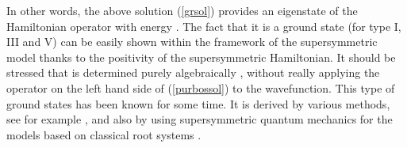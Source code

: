 \documentclass[a4paper,12pt]{article}
\begin{document}
In other words, the above solution (\ref{grsol}) provides an eigenstate of
the
Hamiltonian operator \coordHE{} with energy \coordHE{}.
The fact that it is a ground state (for type I, III and V)  can be easily
shown within the framework of the supersymmetric model \cite{bms} thanks to
the
positivity of the supersymmetric Hamiltonian.
It should
be stressed that
\coordHE{} is determined purely algebraically \cite{bms}, without
really applying the operator on the left hand side of (\ref{purbossol}) to
the
wavefunction.
This type of ground states has been known for some time.
It is derived by various methods, see for example \cite{CalMo,OP2}, and
also by using supersymmetric quantum mechanics
for the models based on classical root systems \cite{FredMend,ShasSuth}.
\end{document}
